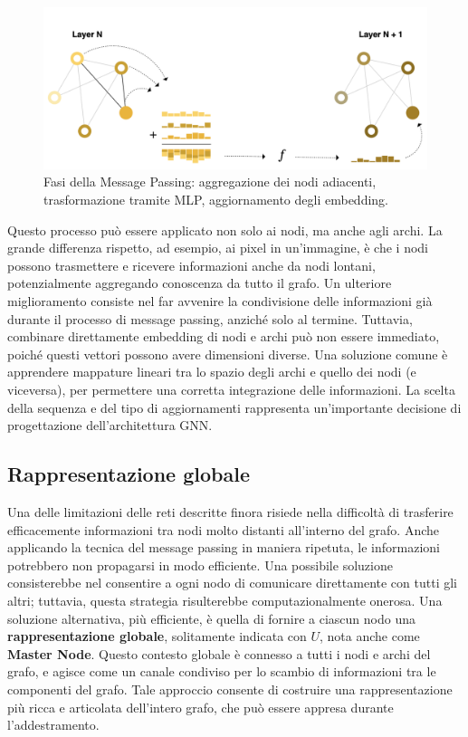\begin{figure}
    \centering
    \includegraphics[width=\textwidth]{figure/MessagePassing.png}
    \caption{Fasi della Message Passing: aggregazione dei nodi adiacenti,   trasformazione tramite MLP, aggiornamento degli embedding.}
    \label{fig:messPass}
\end{figure}
Questo processo può essere applicato non solo ai nodi, ma anche agli archi. La grande differenza rispetto, ad esempio, ai pixel in un’immagine, è che i nodi possono trasmettere e ricevere informazioni anche da nodi lontani, potenzialmente aggregando conoscenza da tutto il grafo. Un ulteriore miglioramento consiste nel far avvenire la condivisione delle informazioni già durante il processo di message passing, anziché solo al termine. Tuttavia, combinare direttamente embedding di nodi e archi può non essere immediato, poiché questi vettori possono avere dimensioni diverse. Una soluzione comune è apprendere mappature lineari tra lo spazio degli archi e quello dei nodi (e viceversa), per permettere una corretta integrazione delle informazioni. La scelta della sequenza e del tipo di aggiornamenti rappresenta un'importante decisione di progettazione dell'architettura GNN.

\subsection{Rappresentazione globale}

Una delle limitazioni delle reti descritte finora risiede nella difficoltà di trasferire efficacemente informazioni tra nodi molto distanti all’interno del grafo. Anche applicando la tecnica del message passing in maniera ripetuta, le informazioni potrebbero non propagarsi in modo efficiente. Una possibile soluzione consisterebbe nel consentire a ogni nodo di comunicare direttamente con tutti gli altri; tuttavia, questa strategia risulterebbe computazionalmente onerosa. Una soluzione alternativa, più efficiente, è quella di fornire a ciascun nodo una \textbf{rappresentazione globale}, solitamente indicata con $U$, nota anche come \textbf{Master Node}. Questo contesto globale è connesso a tutti i nodi e archi del grafo, e agisce come un canale condiviso per lo scambio di informazioni tra le componenti del grafo. Tale approccio consente di costruire una rappresentazione più ricca e articolata dell’intero grafo, che può essere appresa durante l’addestramento.

